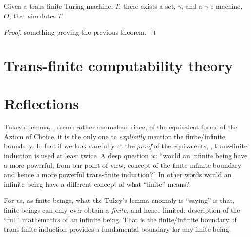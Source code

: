 \documentclass[a4paper,openany]{amsbook}
\begin{document}
\begin{theorem}

Given a trans-finite Turing machine, $T$, there exists a set, $\gamma$, and a
$\gamma$-o-machine, $O$, that simulates $T$.

\end{theorem}

\begin{proof}
something proving the previous theorem.
\end{proof}

\chapter{Trans-finite computability theory}

\chapter{Reflections}

Tukey's lemma, \cite[Maximal Principle II, page 10]{jech1973axiomOfChoice}, seems rather
anomalous since, of the equivalent forms of the Axiom of Choice, it is the only one to
\emph{explicitly} mention the finite/infinite boundary. In fact if we look carefully at
the \emph{proof} of the equivalents, \cite[Theorem 2.1, page 10]{jech1973axiomOfChoice},
trans-finite induction is used at least twice.  A deep question is: ``would an infinite
being have a more powerful, from our point of view, concept of the finite-infinite
boundary and hence a more powerful trans-finite induction?'' In other words would an 
infinite being have a different concept of what ``finite'' means?

For us, as finite beings, what the Tukey's lemma anomaly is ``saying'' is that, finite
beings can only ever obtain a \emph{finite}, and hence limited, description of the
``full'' mathematics of an infinite being. That is the finite/infinite boundary of 
trans-finite induction provides a fundamental boundary for any finite being.

%
%

\printbibliography
\end{document}
